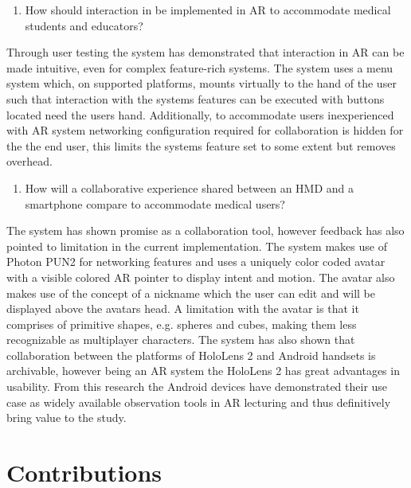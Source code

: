 \begin{enumerate}[label=\textbf{RQ2:}, left=\parindent]
    
    \itshape
    \item How should interaction in be implemented in AR to accommodate medical students and educators?
\end{enumerate}

Through user testing the system has demonstrated that interaction in AR can be made intuitive, even for complex feature-rich systems. The system uses a menu system which, on supported platforms, mounts virtually to the hand of the user such that interaction with the systems features can be executed with buttons located need the users hand. Additionally, to accommodate users inexperienced with AR system networking configuration required for collaboration is hidden for the the end user, this limits the systems feature set to some extent but removes overhead. 

\begin{enumerate}[label=\textbf{RQ3:}, left=\parindent]
    \itshape
    \item How will a collaborative experience shared between an HMD and a smartphone compare to accommodate medical users?
\end{enumerate}

The system has shown promise as a collaboration tool, however feedback has also pointed to limitation in the current implementation. The system makes use of Photon PUN2 for networking features and uses a uniquely color coded avatar with a visible colored AR pointer to display intent and motion. The avatar also makes use of the concept of a nickname which the user can edit and will be displayed above the avatars head. A limitation with the avatar is that it comprises of primitive shapes, e.g. spheres and cubes, making them less recognizable as multiplayer characters. The system has also shown that collaboration between the platforms of HoloLens 2 and Android handsets is archivable, however being an AR system the HoloLens 2 has great advantages in usability. From this research the Android devices have demonstrated their use case as widely available observation tools in AR lecturing and thus definitively bring value to the study.

\section{Contributions}



